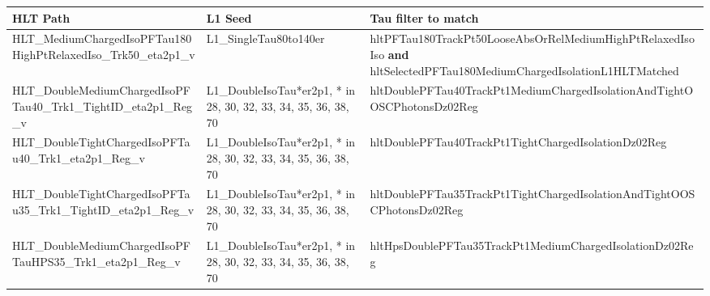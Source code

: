 {\footnotesize
\begin{tabular}{|p{3cm} p{2.5cm} p{8.9cm}|}
\hline
HLT Path & L1 Seed & Tau filter to match \\
\hline
HLT\_MediumChargedIsoPFTau180HighPtRelaxedIso\_Trk50\_eta2p1\_v
&
L1\_SingleTau80to140er
&
hltPFTau180TrackPt50LooseAbsOrRelMediumHighPtRelaxedIsoIso \textbf{and} hltSelectedPFTau180MediumChargedIsolationL1HLTMatched
\\
HLT\_DoubleMediumChargedIsoPFTau40\_Trk1\_TightID\_eta2p1\_Reg\_v
&
L1\_DoubleIsoTau*er2p1, * in 28, 30, 32, 33, 34, 35, 36, 38, 70
&
hltDoublePFTau40TrackPt1MediumChargedIsolationAndTightOOSCPhotonsDz02Reg
\\
HLT\_DoubleTightChargedIsoPFTau40\_Trk1\_eta2p1\_Reg\_v
&
L1\_DoubleIsoTau*er2p1, * in 28, 30, 32, 33, 34, 35, 36, 38, 70
&
hltDoublePFTau40TrackPt1TightChargedIsolationDz02Reg
\\
HLT\_DoubleTightChargedIsoPFTau35\_Trk1\_TightID\_eta2p1\_Reg\_v
&
L1\_DoubleIsoTau*er2p1, * in 28, 30, 32, 33, 34, 35, 36, 38, 70
&
hltDoublePFTau35TrackPt1TightChargedIsolationAndTightOOSCPhotonsDz02Reg
\\
HLT\_DoubleMediumChargedIsoPFTauHPS35\_Trk1\_eta2p1\_Reg\_v
&
L1\_DoubleIsoTau*er2p1, * in 28, 30, 32, 33, 34, 35, 36, 38, 70
&
hltHpsDoublePFTau35TrackPt1MediumChargedIsolationDz02Reg
\\
\hline
\end{tabular}
}
